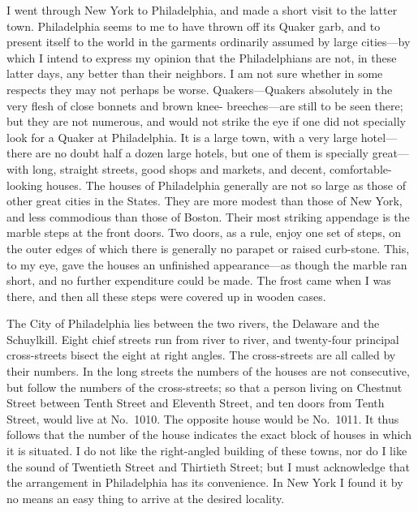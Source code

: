 I went through New York to Philadelphia, and made a short visit to
the latter town.  Philadelphia seems to me to have thrown off its
Quaker garb, and to present itself to the world in the garments
ordinarily assumed by large cities---by which I intend to express my
opinion that the Philadelphians are not, in these latter days, any
better than their neighbors.  I am not sure whether in some
respects they may not perhaps be worse.  Quakers---Quakers
absolutely in the very flesh of close bonnets and brown knee-
breeches---are still to be seen there; but they are not numerous,
and would not strike the eye if one did not specially look for a
Quaker at Philadelphia.  It is a large town, with a very large
hotel---there are no doubt half a dozen large hotels, but one of
them is specially great---with long, straight streets, good shops
and markets, and decent, comfortable-looking houses.  The houses of
Philadelphia generally are not so large as those of other great
cities in the States.  They are more modest than those of New York,
and less commodious than those of Boston.  Their most striking
appendage is the marble steps at the front doors.  Two doors, as a
rule, enjoy one set of steps, on the outer edges of which there is
generally no parapet or raised curb-stone.  This, to my eye, gave
the houses an unfinished appearance---as though the marble ran
short, and no further expenditure could be made.  The frost came
when I was there, and then all these steps were covered up in
wooden cases.

The City of Philadelphia lies between the two rivers, the Delaware
and the Schuylkill.  Eight chief streets run from river to river,
and twenty-four principal cross-streets bisect the eight at right
angles.  The cross-streets are all called by their numbers.  In the
long streets the numbers of the houses are not consecutive, but
follow the numbers of the cross-streets; so that a person living on
Chestnut Street between Tenth Street and Eleventh Street, and ten
doors from Tenth Street, would live at No.\ 1010.  The opposite
house would be No.\ 1011.  It thus follows that the number of the
house indicates the exact block of houses in which it is situated.
I do not like the right-angled building of these towns, nor do I
like the sound of Twentieth Street and Thirtieth Street; but I must
acknowledge that the arrangement in Philadelphia has its
convenience.  In New York I found it by no means an easy thing to
arrive at the desired locality.

